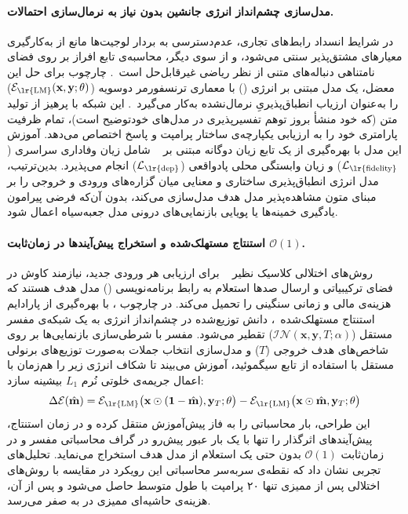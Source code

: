 \paragraph{مدل‌سازی چشم‌انداز انرژی جانشین بدون نیاز به نرمال‌سازی احتمالات.}
در شرایط انسداد رابط‌های تجاری، عدم‌دسترسی به بردار لوجیت‌ها مانع از به‌کارگیری معیارهای مشتق‌پذیر سنتی می‌شود، و از سوی دیگر، محاسبه‌ی تابع افراز بر روی فضای نامتناهی دنباله‌های متنی از نظر ریاضی غیرقابل‌حل است~\cite{lecun2006tutorial}. چارچوب  برای حل این معضل، یک مدل مبتنی بر انرژی () با معماری ترنسفورمر دوسویه ($\mathcal{E}_{\text{\lr{LM}}}(\mathbf{x}, \mathbf{y}; \theta)$) را به‌عنوان ارزیاب انطباق‌پذیریِ نرمال‌نشده به‌کار می‌گیرد~\cite{bakhtin2019realfake, deng2020residual}. این شبکه با پرهیز از تولید متن (که خود منشأ بروز توهم تفسیرپذیری در مدل‌های خودتوضیح است)، تمام ظرفیت پارامتری خود را به ارزیابی یکپارچه‌ی ساختار پرامپت و پاسخ اختصاص می‌دهد. آموزش این مدل با بهره‌گیری از یک تابع زیان دوگانه مبتنی بر ~\cite{oord2018representation} شامل زیان وفاداری سراسری ($\mathcal{L}_{\text{\lr{fidelity}}}$) و زیان وابستگی محلی پادواقعی ($\mathcal{L}_{\text{\lr{dep}}}$) انجام می‌پذیرد. بدین‌ترتیب، مدل انرژی انطباق‌پذیری ساختاری و معنایی میان گزاره‌های ورودی و خروجی را بر مبنای متون مشاهده‌پذیر مدل هدف مدل‌سازی می‌کند، بدون آن‌که فرضی پیرامون یادگیری خمینه‌ها یا پویایی بازنمایی‌های درونی مدل جعبه‌سیاه اعمال شود.

\paragraph{استنتاج مستهلک‌شده و استخراج پیش‌آیندها در زمان‌ثابت $\mathcal{O}(1)$.}
روش‌های اختلالی کلاسیک نظیر ~\cite{ribeiro2016lime} برای ارزیابی هر ورودی جدید، نیازمند کاوش در فضای ترکیبیاتی و ارسال صدها استعلام به رابط برنامه‌نویسی () مدل هدف هستند که هزینه‌ی مالی و زمانی سنگینی را تحمیل می‌کند. در چارچوب ، با بهره‌گیری از پارادایم استنتاج مستهلک‌شده~\cite{tu2018learning, chen2018learning}، دانش توزیع‌شده در چشم‌انداز انرژی به یک شبکه‌ی مفسر مستقل ($\mathcal{IN}(\mathbf{x}, \mathbf{y}, T; \alpha)$) تقطیر می‌شود. مفسر با شرطی‌سازی بازنمایی‌ها بر روی شاخص‌های هدف خروجی ($T$) و مدل‌سازی انتخاب جملات به‌صورت توزیع‌های برنولی مستقل با استفاده از تابع سیگموئید، آموزش می‌بیند تا شکاف انرژی زیر را هم‌زمان با اعمال جریمه‌ی خلوتی نُرم $L_1$ بیشینه سازد:
\begin{equation}\label{eq:chap6_energy_gap}
    \Delta\mathcal{E}(\hat{\mathbf{m}}) = \mathcal{E}_{\text{\lr{LM}}}\big(\mathbf{x} \odot (\mathbf{1} - \hat{\mathbf{m}}), \mathbf{y}_T; \theta\big) - \mathcal{E}_{\text{\lr{LM}}}\big(\mathbf{x} \odot \hat{\mathbf{m}}, \mathbf{y}_T; \theta\big)
\end{equation}
این طراحی، بار محاسباتی را به فاز پیش‌آموزش منتقل کرده و در زمان استنتاج، پیش‌آیندهای اثرگذار را تنها با یک بار عبور پیش‌رو در گراف محاسباتی مفسر و در زمان‌ثابت $\mathcal{O}(1)$ بدون حتی یک استعلام از مدل هدف استخراج می‌نماید. تحلیل‌های تجربی نشان داد که نقطه‌ی سربه‌سر محاسباتی این رویکرد در مقایسه با روش‌های اختلالی پس از ممیزی تنها ۲۰ پرامپت با طول متوسط حاصل می‌شود و پس از آن، هزینه‌ی حاشیه‌ای ممیزی در  به صفر می‌رسد.

